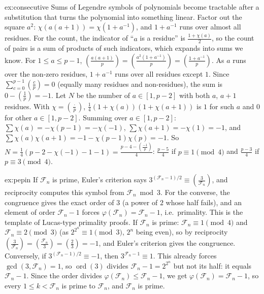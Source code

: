 \begin{solution}{ex:consecutive}
\idea Sums of Legendre symbols of polynomials become tractable after a substitution that turns the polynomial into something linear. Factor out the square $a^2$: $\chi(a(a+1))=\chi(1+a^{-1})$, and $1+a^{-1}$ runs over almost all residues. For the count, the indicator of ``$a$ is a residue'' is $\frac{1+\chi(a)}2$, so the count of pairs is a sum of products of such indicators, which expands into sums we know.
\writeup For $1\le a\le p-1$, $\left(\frac{a(a+1)}p\right)=\left(\frac{a^2(1+a^{-1})}p\right)=\left(\frac{1+a^{-1}}p\right)$. As $a$ runs over the non-zero residues, $1+a^{-1}$ runs over all residues except $1$. Since $\sum_{c=0}^{p-1}\left(\frac cp\right)=0$ (equally many residues and non-residues), the sum is $0-\left(\frac1p\right)=-1$.
Let $N$ be the number of $a\in[1,p-2]$ with both $a$, $a+1$ residues. With $\chi=\left(\frac\cdot p\right)$, $\frac14(1+\chi(a))(1+\chi(a+1))$ is $1$ for such $a$ and $0$ for other $a\in[1,p-2]$. Summing over $a\in[1,p-2]$: $\sum\chi(a)=-\chi(p-1)=-\chi(-1)$, $\sum\chi(a+1)=-\chi(1)=-1$, and $\sum\chi(a)\chi(a+1)=-1-\chi(p-1)\chi(p)=-1$. So $N=\frac14\left(p-2-\chi(-1)-1-1\right)=\frac{p-4-\left(\frac{-1}p\right)}4$: $\frac{p-5}4$ if $p\equiv1\pmod4$ and $\frac{p-3}4$ if $p\equiv3\pmod4$.
\end{solution}

\begin{solution}{ex:pepin}
\idea If $\mathcal F_n$ is prime, Euler's criterion says $3^{(\mathcal F_n-1)/2}\equiv\left(\frac3{\mathcal F_n}\right)$, and reciprocity computes this symbol from $\mathcal F_n\bmod3$. For the converse, the congruence gives the exact order of $3$ (a power of $2$ whose half fails), and an element of order $\mathcal F_n-1$ forces $\varphi(\mathcal F_n)=\mathcal F_n-1$, i.e.\ primality. This is the template of Lucas-type primality proofs.
\writeup If $\mathcal F_n$ is prime: $\mathcal F_n\equiv1\pmod4$ and $\mathcal F_n\equiv2\pmod3$ (as $2^{2^n}\equiv1\pmod 3$, $2^n$ being even), so by reciprocity $\left(\frac3{\mathcal F_n}\right)=\left(\frac{\mathcal F_n}3\right)=\left(\frac23\right)=-1$, and Euler's criterion gives the congruence. Conversely, if $3^{(\mathcal F_n-1)/2}\equiv-1$, then $3^{\mathcal F_n-1}\equiv1$. This already forces $\gcd(3,\mathcal F_n)=1$, so $\operatorname{ord}(3)$ divides $\mathcal F_n-1=2^{2^n}$ but not its half: it equals $\mathcal F_n-1$. Since the order divides $\varphi(\mathcal F_n)\le\mathcal F_n-1$, we get $\varphi(\mathcal F_n)=\mathcal F_n-1$, so every $1\le k<\mathcal F_n$ is prime to $\mathcal F_n$, and $\mathcal F_n$ is prime.
\end{solution}

